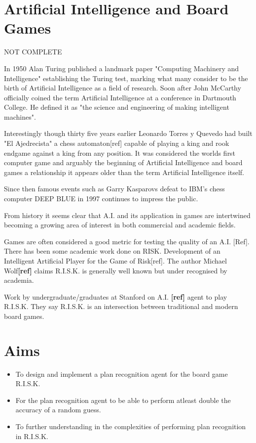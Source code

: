 \documentclass[parskip]{cs4rep}
\begin{document}
\section{Artificial Intelligence and Board Games}

NOT COMPLETE

In 1950 Alan Turing published a landmark paper "Computing Machinery and Intelligence" establishing the Turing test, marking what many consider to be the birth of Artificial Intelligence as a field of research. Soon after John McCarthy officially coined the term Artificial Intelligence at a conference in Dartmouth College. He defined it as "the science and engineering of making intelligent machines".

Interestingly though thirty five years earlier Leonardo Torres y Quevedo had built "El Ajedrecista" a chess automaton[ref] capable of playing a king and rook endgame against a king from any position. It was considered the worlds first computer game and arguably the beginning of Artificial Intelligence and board games a relationship it appears older than the term Artificial Intelligence itself. 

Since then famous events such as Garry Kasparovs defeat to IBM's chess computer DEEP BLUE in 1997 continues to impress the public. 

From history it seems clear that A.I. and its application in games are intertwined becoming a growing area of interest in both commercial and academic fields.

Games are often considered a good metric for testing the quality of an A.I. [Ref]. There has been some academic work done on RISK. Development of an Intelligent Artificial Player for the Game of Risk[ref]. The author Michael Wolf\textbf{[ref]} claims R.I.S.K. is generally well known but under recognised by academia.

Work by undergraduate/graduates at Stanford on A.I. \textbf{[ref]} agent to play R.I.S.K. They say R.I.S.K. is an intersection between traditional and modern board games.

\section{Aims}

\begin{itemize}
\item
To design and implement a plan recognition agent for the board game R.I.S.K.
\item
For the plan recognition agent to be able to perform atleast double the accuracy of a random guess.
\item
To further understanding in the complexities of performing plan recognition in R.I.S.K.
\end{itemize}
\end{document}
